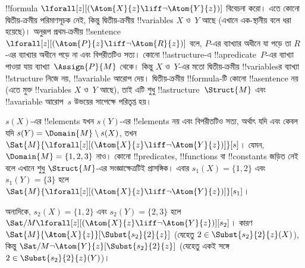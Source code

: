 \documentclass[../../../include/open-logic-section]{subfiles}
\begin{document}
\begin{ex}
  !!{formula} $\lforall[z][(\Atom{X}{z} \liff \lnot
    \Atom{Y}{z})]$ বিবেচনা করো। এতে কোনো দ্বিতীয়-ক্রমীয় পরিমাণসূচক
  নেই, কিন্তু দ্বিতীয়-ক্রমীয় !!{variable}s $X$ ও~$Y$ আছে (এখানে
  এক-স্থানীয় বলে ধরা হয়েছে)। অনুরূপ প্রথম-ক্রমীয় !!{sentence}
  $\lforall[z][(\Atom{P}{z} \liff \lnot \Atom{R}{z})]$ বলে,
  $P$-এর ব্যাখ্যার অধীনে যা পড়ে তা $R$-এর ব্যাখ্যার অধীনে পড়ে না এবং
  বিপরীতটিও সত্য। কোনো !!a{structure}-এ !!a{predicate}~$P$-এর ব্যাখ্যা
  পাওয়া যায় ব্যাখ্যা~$\Assign{P}{M}$ থেকে। কিন্তু $X$ ও~$Y$-এর
  মতো দ্বিতীয়-ক্রমীয় !!{variable}sর ব্যাখ্যা !!{structure} নিজে নয়,
  !!a{variable} আরোপ দেয়। দ্বিতীয়-ক্রমীয় !!{formula}-টি কোনো
  !!a{sentence} নয় (এতে মুক্ত !!{variable}s $X$ ও~$Y$ আছে), তাই এটি
  শুধু !!a{structure}~$\Struct{M}$ এবং !!a{variable} আরোপ~$s$
  উভয়ের সাপেক্ষে পরিতৃপ্ত হয়।

  $s(X)$-এর !!{element}s যখন $s(Y)$-এর !!{element}s নয় এবং বিপরীতটিও
  সত্য, অর্থাৎ যদি এবং কেবল যদি $s(Y) = \Domain{M} \setminus s(X)$,
  তখন
  $\Sat{M}{\lforall[z][(\Atom{X}{z} \liff \lnot \Atom{Y}{z})]}[s]$।
  যেমন, $\Domain{M} = \{1, 2, 3\}$ নাও। কোনো !!{predicate}s,
  !!{function}s বা !!{constant}s জড়িত নেই বলে এখানে শুধু
  $\Struct{M}$-এর সংজ্ঞাক্ষেত্রটিই প্রাসঙ্গিক। এবার $s_1(X) = \{1, 2\}$ এবং
  $s_1(Y) = \{3\}$ হলে
  $\Sat{M}{\lforall[z][(\Atom{X}{z}
      \liff \lnot \Atom{Y}{z})]}[s_1]$।

  অন্যদিকে, $s_2(X) = \{1, 2\}$ এবং $s_2(Y) = \{2, 3\}$ হলে
  $\Sat/{M}{\lforall[z][(\Atom{X}{z} \liff \lnot
      \Atom{Y}{z})]}[s_2]$। কারণ
  $\Sat{M}{\Atom{X}{z}}[\Subst{s_2}{2}{z}]$ (যেহেতু $2 \in
  \Subst{s_2}{2}{z}(X)$), কিন্তু
  $\Sat/{M}{\lnot \Atom{Y}{z}}[\Subst{s_2}{2}{z}]$ (যেহেতু একই সঙ্গে
  $2 \in \Subst{s_2}{2}{z}(Y)$)।
\end{ex}
\end{document}
